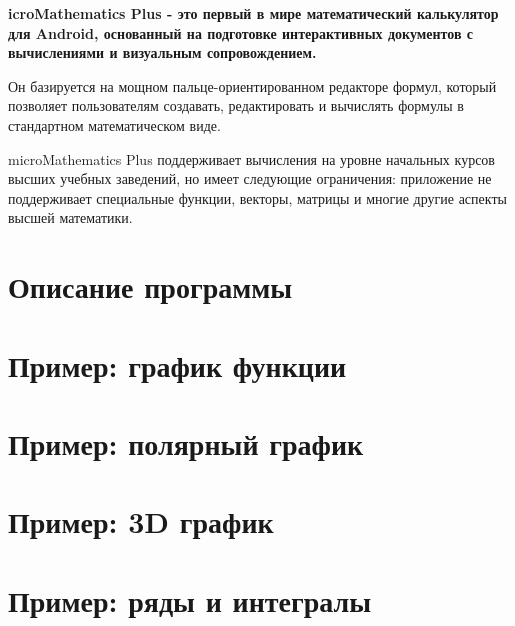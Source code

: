 \documentclass[DIV=calc, paper=a4, fontsize=11pt, twocolumn]{scrartcl}
\begin{document}
\maketitle
\thispagestyle{fancy} %

\textbf{icroMathematics Plus - это первый в мире математический
калькулятор для Android, основанный на подготовке интерактивных документов с
вычислениями и визуальным сопровождением.}

\begin{bf}
Он базируется на мощном пальце-ориентированном редакторе формул, который
позволяет пользователям создавать, редактировать и вычислять формулы в
стандартном математическом виде.

microMathematics Plus поддерживает вычисления на уровне начальных курсов
высших учебных заведений, но имеет следующие ограничения: приложение не
поддерживает специальные функции, векторы, матрицы и многие другие аспекты
высшей математики.
\end{bf}

\section{Описание программы}


\section{Пример: график функции}


\section{Пример: полярный график}


\section{Пример: 3D график}


\section{Пример: ряды и интегралы}

\end{document}
